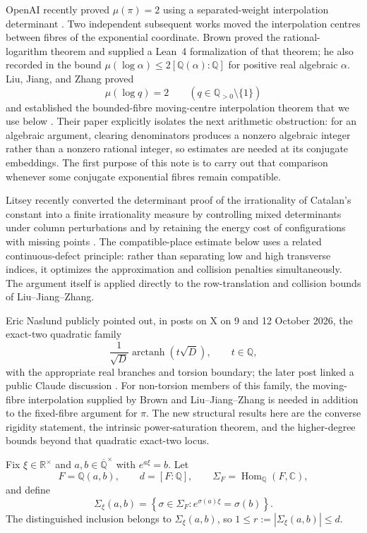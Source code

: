 \documentclass[11pt]{article}
\newcommand{\CC}{\mathbb C}
\newcommand{\RR}{\mathbb R}
\newcommand{\QQ}{\mathbb Q}
\newcommand{\Qbar}{\overline{\mathbb Q}}
\newcommand{\Comp}{\Sigma_{\xi}(a,b)}
\DeclareMathOperator{\Hom}{Hom}
\DeclareMathOperator{\arctanh}{arctanh}
\theoremstyle{definition}
\theoremstyle{remark}
\numberwithin{equation}{section}
\begin{document}
OpenAI recently proved $\mu(\pi)=2$ using a separated-weight
interpolation determinant \cite{OpenAI2026}.  Two independent subsequent
works moved the interpolation centres between fibres of the exponential
coordinate.  Brown proved the rational-logarithm theorem and supplied a
Lean~4 formalization of that theorem; he also recorded in
\cite[Proposition~5.1]{Brown2026} the bound
$\mu(\log\alpha)\le2[\QQ(\alpha):\QQ]$ for positive real algebraic
$\alpha$.  Liu, Jiang, and Zhang proved
\[
  \mu(\log q)=2
  \qquad(q\in\QQ_{>0}\setminus\{1\})
\]
and established the bounded-fibre moving-centre interpolation theorem
that we use below \cite{LiuJiangZhang2026}.  Their paper explicitly
isolates the next arithmetic obstruction: for an algebraic argument,
clearing denominators produces a nonzero algebraic integer rather than a
nonzero rational integer, so estimates are needed at its conjugate
embeddings.  The first purpose of this note is to carry out that
comparison whenever some conjugate exponential fibres remain compatible.

Litsey recently converted the determinant proof of the irrationality of
Catalan's constant into a finite irrationality measure by controlling mixed
determinants under column perturbations and by retaining the energy cost of
configurations with missing points \cite[Theorem~5.1 and
Proposition~5.10]{Litsey2026}.  The compatible-place estimate below uses a
related continuous-defect principle: rather than separating low and high
transverse indices, it optimizes the approximation and collision penalties
simultaneously.  The argument itself is applied directly to the
row-translation and collision bounds of Liu--Jiang--Zhang.

Eric Naslund publicly pointed out, in posts on X on 9 and 12 October
2026, the exact-two quadratic family
\[
 \frac{1}{\sqrt D}\arctanh(t\sqrt D),
 \qquad t\in\QQ,
\]
with the appropriate real branches and torsion boundary; the later post
linked a public Claude discussion \cite{Naslund2026}.  For non-torsion
members of this family, the moving-fibre interpolation supplied by Brown
and Liu--Jiang--Zhang is needed in addition to the fixed-fibre argument
for $\pi$.  The new structural results here are the converse rigidity
statement, the intrinsic power-saturation theorem, and the higher-degree
bounds beyond that quadratic exact-two locus.

Fix $\xi\in\RR^\times$ and $a,b\in\Qbar^\times$ with $e^{a\xi}=b$.
Let
\[
 F=\QQ(a,b),\qquad d=[F:\QQ],\qquad
 \Sigma_F=\Hom_{\QQ}(F,\CC),
\]
and define
\begin{equation}\label{eq:compatible-set}
 \Comp=
 \left\{\sigma\in\Sigma_F:
   e^{\sigma(a)\xi}=\sigma(b)\right\}.
\end{equation}
The distinguished inclusion belongs to $\Comp$, so
$1\le r:=|\Comp|\le d$.
\end{document}
